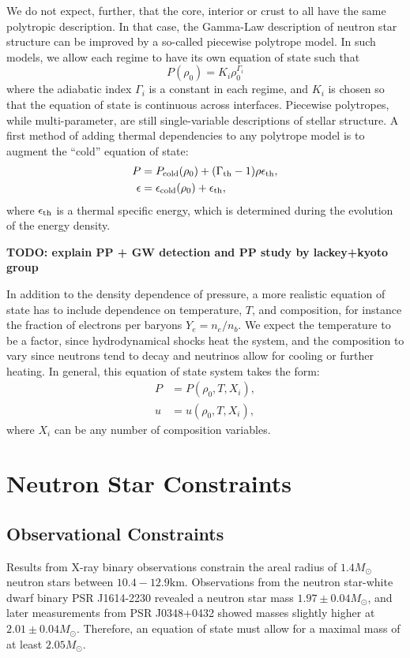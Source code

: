 We do not expect, further, that the core, interior or crust to all have the same polytropic description.
In that case, the Gamma-Law description of neutron star structure can be improved by a so-called piecewise polytrope model.
In such models, we allow each regime to have its own equation of state such that 
$$P(\rho_0) = K_i \rho_0^{\Gamma_i}$$
where the adiabatic index $\Gamma_i$ is a constant in each regime, and $K_i$ is chosen so that the equation of state is continuous across interfaces.  
Piecewise polytropes, while multi-parameter, are still single-variable descriptions of stellar structure.  
A first method of adding thermal dependencies to any polytrope model is to augment the ``cold'' equation of state:
\begin{align}
P &=  P_{\rm cold}(\rho_0) + (\Gamma_{\rm th}-1)\rho\epsilon_{\rm th} ,\\
\epsilon &=  \epsilon_{\rm cold}(\rho_0) + \epsilon_{\rm th}, 
\end{align}
where $\epsilon_{\rm th}$ is a thermal specific energy, which is determined during the evolution of the energy density.

\textbf{TODO: explain PP + GW detection and PP study by lackey+kyoto group}


In addition to the density dependence of pressure, a more realistic equation of state has to include dependence on temperature, $T$, and composition, for instance the fraction of electrons per baryons $Y_e = n_e / n_b$.  
We expect the temperature to be a factor, since hydrodynamical shocks heat the system, and the composition to vary since neutrons tend to decay and neutrinos allow for cooling or further heating. 
In general, this equation of state system takes the form:
\begin{align}
P &= P(\rho_0, T, X_i), \\
u &= u(\rho_0, T, X_i),
\end{align}
where $X_i$ can be any number of composition variables.

\section{Neutron Star Constraints}
\label{sec:constraints}

\subsection{Observational Constraints}

Results from X-ray binary observations constrain the areal radius of $1.4M_\odot$ neutron stars between $10.4 - 12.9 \textrm{km}$.
Observations from the neutron star-white dwarf binary PSR J1614-2230 revealed a neutron star mass $1.97 \pm 0.04 M_\odot$, and later measurements from PSR J0348+0432 showed masses slightly higher at  $2.01 \pm 0.04 M_\odot$.  Therefore, an equation of state must allow for a maximal mass of at least $2.05 M_{\odot}$.

